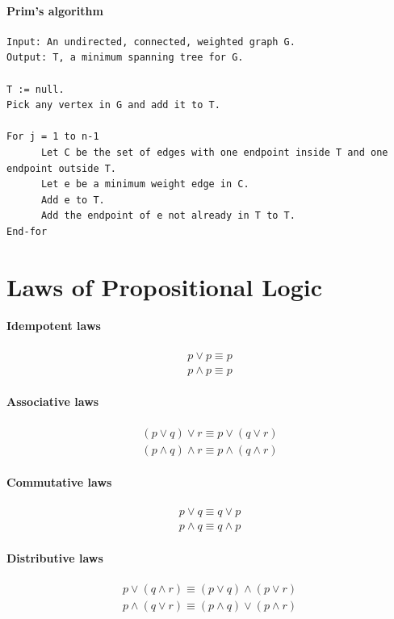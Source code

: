 \documentclass[a4paper]{article}
\begin{document}
  \paragraph{Prim's algorithm}
  \begin{lstlisting}
Input: An undirected, connected, weighted graph G.
Output: T, a minimum spanning tree for G.

T := null.
Pick any vertex in G and add it to T.

For j = 1 to n-1
      Let C be the set of edges with one endpoint inside T and one endpoint outside T.
      Let e be a minimum weight edge in C.
      Add e to T.
      Add the endpoint of e not already in T to T.
End-for
  \end{lstlisting}
  \pagebreak
\section{Laws of Propositional Logic}
\paragraph{Idempotent laws}
\begin{align*}
 p \lor p \equiv p \\
 p \land p \equiv p
\end{align*}
\paragraph{Associative laws}
\begin{align*}
 (p \lor q) \lor r \equiv p \lor (q \lor r) \\
 (p \land q) \land r \equiv p \land (q \land r)
\end{align*}
\paragraph{Commutative laws}
\begin{align*}
 p \lor q \equiv q \lor p \\
 p \land q \equiv q \land p
\end{align*}
\paragraph{Distributive laws}
\begin{align*}
  p \lor (q \land r) \equiv (p \lor q) \land (p \lor r) \\
  p \land (q \lor r) \equiv (p \land q) \lor (p \land r)
\end{align*}
\end{document}

